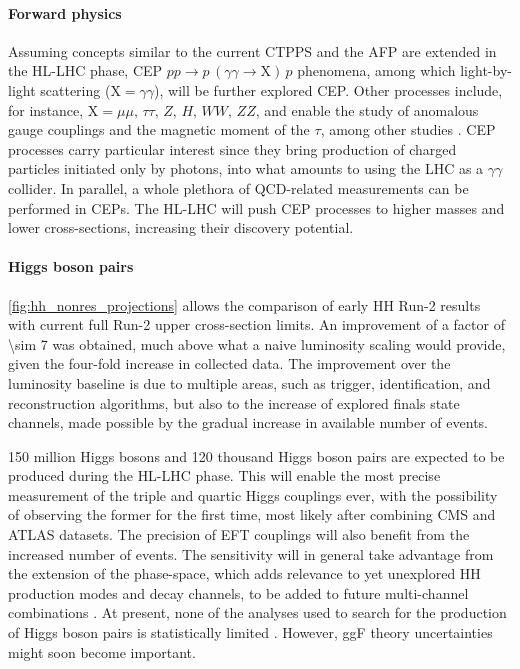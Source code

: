 \documentclass[11pt]{article}
\newcommand{\run}[1]{Run-#1}
\begin{document}
\paragraph{Forward physics}

Assuming concepts similar to the current \ac{CTPPS} \cite{ctpps_tdr} and the \ac{AFP} \cite{afp_tdr} are extended in the \ac{HL-LHC} phase, \ac{CEP} \(pp \rightarrow p\,(\gamma\gamma\rightarrow \text{X})\,p\) phenomena, among which light-by-light scattering (\(\text{X} = \gamma\gamma\)), will be further explored \ac{CEP}.
Other processes include, for instance, \(\text{X} = \mu\mu,\,\tau\tau,\,Z,\,H,\,WW,\,ZZ\), and enable the study of anomalous gauge couplings and the magnetic moment of the \(\tau\), among other studies \cite{ctpps_varela,ctpps_pitt}.
\ac{CEP} processes carry particular interest since they bring production of charged particles initiated only by photons, into what amounts to using the \ac{LHC} as a \(\gamma\gamma\) collider.
In parallel, a whole plethora of \ac{QCD}-related measurements can be performed in \acp{CEP}.
The \ac{HL-LHC} will push \ac{CEP} processes to higher masses and lower cross-sections, increasing their discovery potential.


\paragraph{Higgs boson pairs}

\cref{fig:hh_nonres_projections} allows the comparison of early HH \run{2} results with current full \run{2} upper cross-section limits.
An improvement of a factor of \num{\sim 7} was obtained, much above what a naive luminosity scaling would provide, given the four-fold increase in collected data.
The improvement over the luminosity baseline is due to multiple areas, such as trigger, identification, and reconstruction algorithms, but also to the increase of explored finals state channels, made possible by the gradual increase in available number of events.

\num{150} million Higgs bosons and \num{120} thousand Higgs boson pairs are expected to be produced during the \ac{HL-LHC} phase.
This will enable the most precise measurement of the triple and quartic Higgs couplings ever, with the possibility of observing the former for the first time, most likely after combining \ac{CMS} and \ac{ATLAS} datasets.
The precision of \ac{EFT} couplings will also benefit from the increased number of events.
The sensitivity will in general take advantage from the extension of the phase-space, which adds relevance to yet unexplored HH production modes and decay channels, to be added to future multi-channel combinations \cite{higgs_10_years}.
At present, none of the analyses used to search for the production of Higgs boson pairs is statistically limited \cite{andre_david_higgs_ten_years}.
However, \ac{ggF} theory uncertainties might soon become important.
\end{document}
